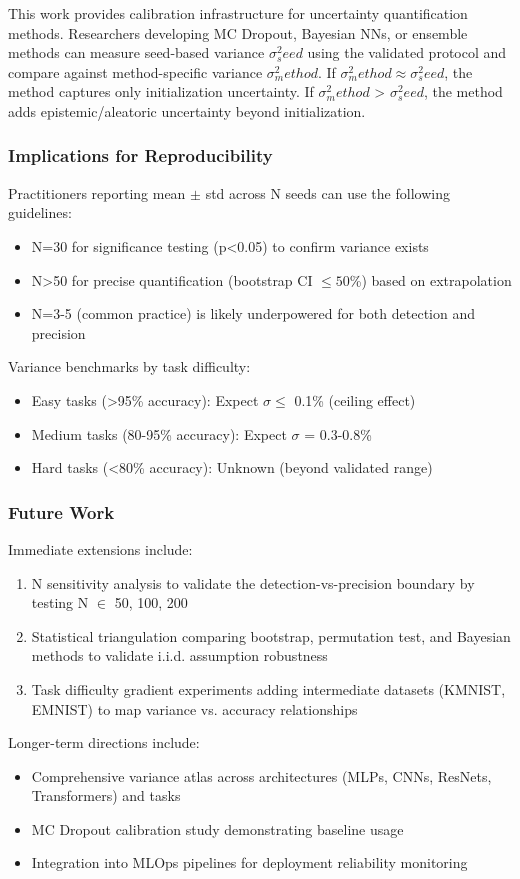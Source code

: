This work provides calibration infrastructure for uncertainty quantification methods. Researchers developing MC Dropout, Bayesian NNs, or ensemble methods can measure seed-based variance $\sigma ^{2}_seed$ using the validated protocol and compare against method-specific variance $\sigma ^{2}_method$. If $\sigma ^{2}_method \approx \sigma ^{2}_seed$, the method captures only initialization uncertainty. If $\sigma ^{2}_method$ > $\sigma ^{2}_seed$, the method adds epistemic/aleatoric uncertainty beyond initialization.

\subsubsection{Implications for Reproducibility}

Practitioners reporting mean $\pm$ std across N seeds can use the following guidelines:
\begin{itemize}
\item N=30 for significance testing (p<0.05) to confirm variance exists
\item N>50 for precise quantification (bootstrap CI $\leq 50$\%) based on extrapolation
\item N=3-5 (common practice) is likely underpowered for both detection and precision
\end{itemize}

Variance benchmarks by task difficulty:
\begin{itemize}
\item Easy tasks (>95\% accuracy): Expect $\sigma \leq$ 0.1\% (ceiling effect)
\item Medium tasks (80-95\% accuracy): Expect $\sigma$ = 0.3-0.8\%
\item Hard tasks (<80\% accuracy): Unknown (beyond validated range)
\end{itemize}

\subsubsection{Future Work}

Immediate extensions include:
\begin{enumerate}
\item N sensitivity analysis to validate the detection-vs-precision boundary by testing N $\in$ {50, 100, 200}
\item Statistical triangulation comparing bootstrap, permutation test, and Bayesian methods to validate i.i.d. assumption robustness
\item Task difficulty gradient experiments adding intermediate datasets (KMNIST, EMNIST) to map variance vs. accuracy relationships
\end{enumerate}

Longer-term directions include:
\begin{itemize}
\item Comprehensive variance atlas across architectures (MLPs, CNNs, ResNets, Transformers) and tasks
\item MC Dropout calibration study demonstrating baseline usage
\item Integration into MLOps pipelines for deployment reliability monitoring
\end{itemize}
